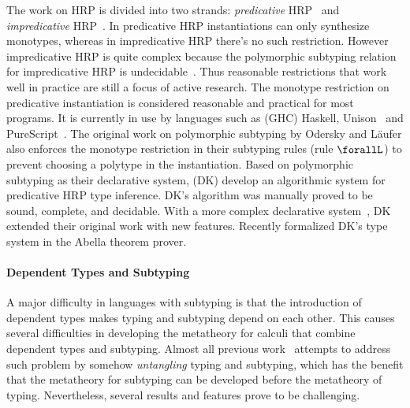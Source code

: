 The work on HRP is divided into two strands: \emph{predicative} HRP~\citep{dunfield2013complete,jones2007practical,odersky1996putting,dunfield2019sound,zhao19mechanical}
and \emph{impredicative} HRP~\citep{le2003ml,leijen2008hmf,vytiniotis2008fph,Serrano2018}.
In predicative HRP instantiations can
only synthesize monotypes, whereas in impredicative HRP there's no
such restriction. However impredicative HRP is quite complex because
the polymorphic subtyping relation for impredicative HRP is undecidable~\citep{tiuryn1996subtyping}.
Thus reasonable restrictions that work well in practice are still
a focus of active research.
The monotype restriction on predicative instantiation is considered reasonable
and practical for most programs. It is currently in use by languages such as
(GHC) Haskell, Unison~\citep{Unison} and PureScript~\citep{PureScript}.
The original work on polymorphic subtyping by Odersky and L\"aufer also enforces
the monotype restriction in their subtyping rules (rule $\forallL$) to prevent
choosing a polytype in the instantiation. Based on polymorphic subtyping as
their declarative system,
\cite{dunfield2013complete} (DK) develop an
algorithmic system for predicative HRP type inference. DK's algorithm was
manually proved to be sound, complete, and decidable.
With a more complex declarative system~\citep{dunfield2019sound}, DK
extended their original work with new features.
Recently \cite{zhao19mechanical} formalized DK's type system in the Abella
theorem prover.

\paragraph{Dependent Types and Subtyping}
A major difficulty in languages with subtyping is that the introduction of dependent
types makes typing and subtyping depend on each other. This causes
several difficulties in developing the metatheory for calculi that
combine dependent types and subtyping. Almost all previous
work~\citep{subdep,ptssub,chen1,cocsub,Chen03coc} attempts to address such problem by somehow
\emph{untangling} typing and subtyping, which has the benefit that the
metatheory for subtyping can be developed before the metatheory of
typing. Nevertheless, several results and features prove to be
challenging.

